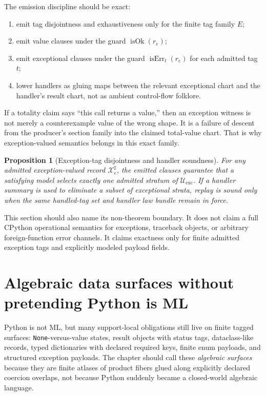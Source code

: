 \documentclass[11pt]{report}
\newtheorem{proposition}[definition]{Proposition}
\begin{document}
The emission discipline should be exact:
\begin{enumerate}
\item emit tag disjointness and exhaustiveness only for the finite tag family $E$;
\item emit value clauses under the guard $\operatorname{isOk}(r_e)$;
\item emit exceptional clauses under the guard $\operatorname{isErr}_t(r_e)$ for each admitted tag $t$;
\item lower handlers as gluing maps between the relevant exceptional chart and the handler's result chart, not as ambient control-flow folklore.
\end{enumerate}

If a totality claim says ``this call returns a value,'' then an exception witness is not merely a counterexample value of the wrong shape. It is a failure of descent from the producer's section family into the claimed total-value chart. That is why exception-valued semantics belongs in this exact family.

\begin{proposition}[Exception-tag disjointness and handler soundness]
For any admitted exception-valued record $\mathcal{X}^{\sharp}_{e}$, the emitted clauses guarantee that a satisfying model selects exactly one admitted stratum of $\mathcal{U}_{\mathrm{exc}}$. If a handler summary is used to eliminate a subset of exceptional strata, replay is sound only when the same handled-tag set and handler law bundle remain in force.
\end{proposition}

This section should also name its non-theorem boundary. It does not claim a full CPython operational semantics for exceptions, traceback objects, or arbitrary foreign-function error channels. It claims exactness only for finite admitted exception tags and explicitly modeled payload fields.

\section{Algebraic data surfaces without pretending Python is ML}
Python is not ML, but many support-local obligations still live on finite tagged surfaces: \texttt{None}-versus-value states, result objects with status tags, dataclass-like records, typed dictionaries with declared required keys, finite enum payloads, and structured exception payloads. The chapter should call these \emph{algebraic surfaces} because they are finite atlases of product fibers glued along explicitly declared coercion overlaps, not because Python suddenly became a closed-world algebraic language.
\end{document}
